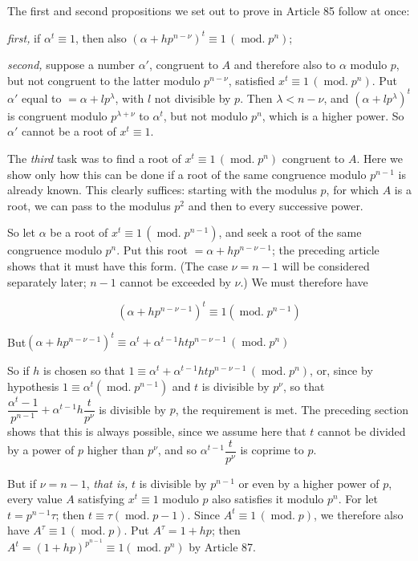 The first and second propositions we set out to prove in Article 85 follow at once:

\emph{first,} if $\alpha^t\equiv1$, then also $(\alpha+hp^{n-\nu})^t\equiv1\,(\operatorname{mod.}p^n)$;

\emph{second,} suppose a number $\alpha'$, congruent to $A$ and therefore also to $\alpha$ modulo $p$, but not congruent to the latter modulo $p^{n-\nu}$, satisfied $x^t\equiv1\,(\operatorname{mod.}p^n)$. Put $\alpha'$ equal to $=\alpha+lp^{\lambda}$, with $l$ not divisible by $p$. Then $\lambda<n-\nu$, and $(\alpha+lp^{\lambda})^t$ is congruent modulo $p^{\lambda+\nu}$ to $\alpha^t$, but not modulo $p^n$, which is a higher power. So $\alpha'$ cannot be a root of $x^t\equiv1$.

The \emph{third} task was to find a root of $x^t\equiv1\,(\operatorname{mod.}p^n)$ congruent to $A$. Here we show only how this can be done if a root of the same congruence modulo $p^{n-1}$ is already known. This clearly suffices: starting with the modulus $p$, for which $A$ is a root, we can pass to the modulus $p^2$ and then to every successive power.

So let $\alpha$ be a root of $x^t\equiv1\,(\operatorname{mod.}p^{n-1})$, and seek a root of the same congruence modulo $p^n$. Put this root $=\alpha+hp^{n-\nu-1}$; the preceding article shows that it must have this form. (The case $\nu=n-1$
will be considered separately later; $n-1$ cannot be exceeded by $\nu$.) We must therefore have

\[(\alpha+hp^{n-\nu-1})^t\equiv1(\operatorname{mod.}p^{n-1})\]

\noindent But\hfill $(\alpha+hp^{n-\nu-1})^t\equiv\alpha^t+\alpha^{t-1}htp^{n-\nu-1}\,(\operatorname{mod.}p^n)$\hfill\mbox{}

\noindent So if $h$ is chosen so that $1\equiv\alpha^t+\alpha^{t-1}htp^{n-\nu-1}\,(\operatorname{mod.}p^n)$, or, since by hypothesis $1\equiv\alpha^t(\operatorname{mod.}p^{n-1})$ and $t$ is divisible by $p^{\nu}$, so that $\dfrac{\alpha^t-1}{p^{n-1}}+\alpha^{t-1}h\dfrac{t}{p^{\nu}}$ is divisible by $p$, the requirement is met. The preceding section shows that this is always possible, since we assume here that $t$ cannot be divided by a power of $p$ higher than $p^{\nu}$, and so $\alpha^{t-1}\dfrac{t}{p^{\nu}}$ is coprime to $p$.

But if $\nu=n-1$, \emph{that is,} $t$ is divisible by $p^{n-1}$ or even by a higher power of $p$, every value $A$ satisfying $x^t\equiv1$ modulo $p$ also satisfies it modulo $p^n$. For let $t=p^{n-1}\tau$; then $t\equiv\tau(\operatorname{mod.}p-1)$. Since $A^t\equiv1\,(\operatorname{mod.}p)$, we therefore also have $A^{\tau}\equiv1\,(\operatorname{mod.}p)$. Put $A^{\tau}=1+hp$; then $A^t=(1+hp)^{p^{n-1}}\equiv1(\operatorname{mod.}p^n)$ by Article 87.


